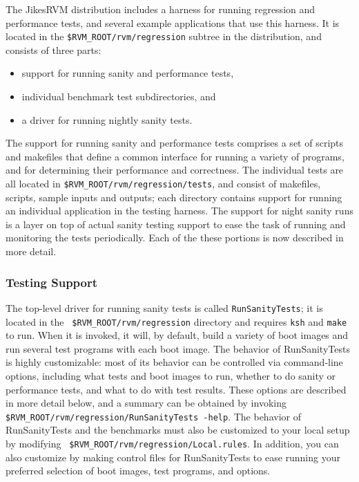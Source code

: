 
 The Jikes\trademark RVM distribution includes a harness for running
regression and 
performance tests, and several example applications that use this
harness.  It is located in the {\tt \$RVM\_ROOT/rvm/regression}
subtree in the 
distribution, and consists of three parts: 
\begin{itemize}
\item support for running sanity and performance tests, 
\item individual benchmark test subdirectories, and 
\item a driver for running nightly sanity tests.  
\end{itemize}
The support for running
sanity and performance tests comprises a set of scripts and makefiles
that define a common interface for running a variety of programs, and
for determining their performance and correctness.  The individual
tests are all located in {\tt{\$RVM\_ROOT/rvm/regression/tests}}, and
consist of makefiles, scripts, sample inputs and outputs; each
directory contains support for running an individual application in
the testing harness.  The support for night sanity runs is a layer on
top of actual sanity testing support to ease the task of running and
monitoring the tests periodically.  Each of the these portions is now
described in more detail.

\subsubsection{Testing Support}

  The top-level driver for running sanity tests is called
{\tt{RunSanityTests}}; it is located in the {\tt
\$RVM\_ROOT/rvm/regression} directory 
and requires {\tt{ksh}} and {{\tt make}} to run.  When it
is invoked, it will, by default, build a variety of boot images and
run several test programs with each boot image.  The behavior of
RunSanityTests is highly customizable: most of its behavior can be
controlled via command-line options, including what tests and boot
images to run, whether to do sanity or performance tests, and what to
do with test results. These options are described in more detail
below, and a summary can be obtained by invoking {\tt
\$RVM\_ROOT/rvm/regression/RunSanityTests -help}.  The behavior of
RunSanityTests and the benchmarks must also be customized to your
local setup by modifying {\tt
\$RVM\_ROOT/rvm/regression/Local.rules}.  In addition, you can also
customize by making control files for RunSanityTests to ease running
your preferred selection of boot images, test programs, and options.

